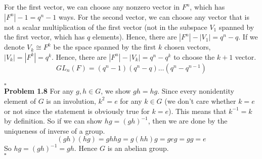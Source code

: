 \documentclass[12pt]{amsart}
\begin{document}
For the first vector, we can choose any nonzero vector in $F^n$, which has $|F^n|-1=q^n-1$ ways. For the second vector, we can choose any vector that is not a scalar multiplication of the first vector (not in the subspace $V_1$ spanned by the first vector, which has $q$ elements). Hence, there are $|F^n|-|V_1|=q^n-q$. If we denote $V_k\cong F^k$ be the space spanned by the first $k$ chosen vectors, $|V_k|=|F^k|=q^k$. Hence, there are $|F^n|-|V_k|=q^n-q^k$ to choose the $k+1$ vector.
\[GL_n(F)=(q^n-1)(q^n-q)\dots(q^n-q^{n-1})\]
\\\phantom{qed}\hfill$\square$\\
\textbf{Problem 1.8} For any $g,h\in G$, we show $gh=hg$. Since every nonidentity element of $G$ is an involution, $k^2=e$ for any $k\in G$ (we don't care whether $k=e$ or not since the statement is obviously true for $k=e$). This means that $k^{-1}=k$ by definition. So if we can show $hg=(gh)^{-1}$, then we are done by the uniqueness of inverse of a group.
\[(gh)(hg)=ghhg=g(hh)g=geg=gg=e\]
So $hg=(gh)^{-1}=gh$. Hence $G$ is an abelian group.
\\\phantom{qed}\hfill$\square$\\
\end{document}
